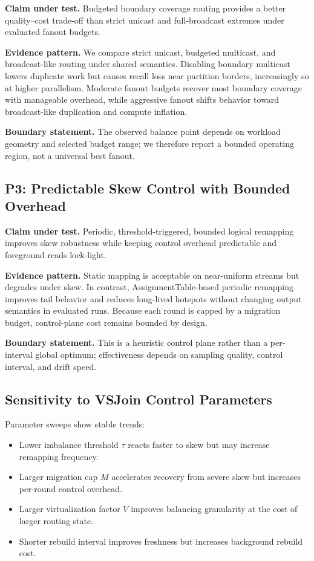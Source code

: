 \textbf{Claim under test.}
Budgeted boundary coverage routing provides a better quality--cost trade-off than strict unicast and full-broadcast extremes under evaluated fanout budgets.

\textbf{Evidence pattern.}
We compare strict unicast, budgeted multicast, and broadcast-like routing under shared semantics. Disabling boundary multicast lowers duplicate work but causes recall loss near partition borders, increasingly so at higher parallelism. Moderate fanout budgets recover most boundary coverage with manageable overhead, while aggressive fanout shifts behavior toward broadcast-like duplication and compute inflation.

\textbf{Boundary statement.}
The observed balance point depends on workload geometry and selected budget range; we therefore report a bounded operating region, not a universal best fanout.

\subsection{P3: Predictable Skew Control with Bounded Overhead}

\textbf{Claim under test.}
Periodic, threshold-triggered, bounded logical remapping improves skew robustness while keeping control overhead predictable and foreground reads lock-light.

\textbf{Evidence pattern.}
Static mapping is acceptable on near-uniform streams but degrades under skew. In contrast, AssignmentTable-based periodic remapping improves tail behavior and reduces long-lived hotspots without changing output semantics in evaluated runs. Because each round is capped by a migration budget, control-plane cost remains bounded by design.

\textbf{Boundary statement.}
This is a heuristic control plane rather than a per-interval global optimum; effectiveness depends on sampling quality, control interval, and drift speed.

\subsection{Sensitivity to VSJoin Control Parameters}

Parameter sweeps show stable trends:
\begin{itemize}
    \item Lower imbalance threshold $\tau$ reacts faster to skew but may increase remapping frequency.
    \item Larger migration cap $M$ accelerates recovery from severe skew but increases per-round control overhead.
    \item Larger virtualization factor $V$ improves balancing granularity at the cost of larger routing state.
    \item Shorter rebuild interval improves freshness but increases background rebuild cost.
\end{itemize}

